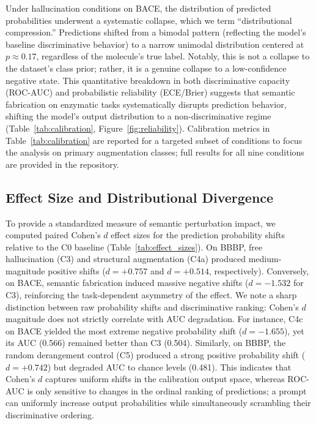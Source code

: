 Under hallucination conditions on BACE, the distribution of predicted probabilities underwent a systematic collapse, which we term ``distributional compression.'' Predictions shifted from a bimodal pattern (reflecting the model's baseline discriminative behavior) to a narrow unimodal distribution centered at $p \approx 0.17$, regardless of the molecule's true label. Notably, this is not a collapse to the dataset's class prior; rather, it is a genuine collapse to a low-confidence negative state. This quantitative breakdown in both discriminative capacity (ROC-AUC) and probabilistic reliability (ECE/Brier) suggests that semantic fabrication on enzymatic tasks systematically disrupts prediction behavior, shifting the model's output distribution to a non-discriminative regime (Table~\ref{tab:calibration}, Figure~\ref{fig:reliability}). Calibration metrics in Table~\ref{tab:calibration} are reported for a targeted subset of conditions to focus the analysis on primary augmentation classes; full results for all nine conditions are provided in the repository.



\subsection{Effect Size and Distributional Divergence}
\label{sec:effect_size}

To provide a standardized measure of semantic perturbation impact, we computed paired Cohen's $d$ effect sizes for the prediction probability shifts relative to the C0 baseline (Table~\ref{tab:effect_sizes}). On BBBP, free hallucination (C3) and structural augmentation (C4a) produced medium-magnitude positive shifts ($d = +0.757$ and $d = +0.514$, respectively). Conversely, on BACE, semantic fabrication induced massive negative shifts ($d = -1.532$ for C3), reinforcing the task-dependent asymmetry of the effect. We note a sharp distinction between raw probability shifts and discriminative ranking: Cohen's $d$ magnitude does not strictly correlate with AUC degradation. For instance, C4c on BACE yielded the most extreme negative probability shift ($d = -1.655$), yet its AUC (0.566) remained better than C3 (0.504). Similarly, on BBBP, the random derangement control (C5) produced a strong positive probability shift ($d = +0.742$) but degraded AUC to chance levels (0.481). This indicates that Cohen's $d$ captures uniform shifts in the calibration output space, whereas ROC-AUC is only sensitive to changes in the ordinal ranking of predictions; a prompt can uniformly increase output probabilities while simultaneously scrambling their discriminative ordering.

